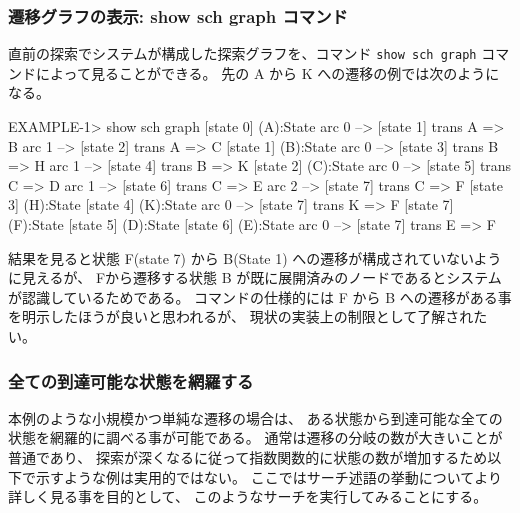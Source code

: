 \documentclass{article}
\begin{document}
\subsubsection{遷移グラフの表示: show sch graph コマンド}
\label{sec:show-sch-graph}
直前の探索でシステムが構成した探索グラフを、コマンド \texttt{show sch graph} コマンドによって見ることができる。
先の A から K への遷移の例では次のようになる。
\begin{simplev}
EXAMPLE-1> show sch graph
[state 0] (A):State
  arc 0 --> [state 1] 
    trans A => B
  arc 1 --> [state 2] 
    trans A => C
[state 1] (B):State
  arc 0 --> [state 3] 
    trans B => H
  arc 1 --> [state 4] 
    trans B => K
[state 2] (C):State
  arc 0 --> [state 5] 
    trans C => D
  arc 1 --> [state 6] 
    trans C => E
  arc 2 --> [state 7] 
    trans C => F
[state 3] (H):State
[state 4] (K):State
  arc 0 --> [state 7] 
    trans K => F
[state 7] (F):State
[state 5] (D):State
[state 6] (E):State
  arc 0 --> [state 7] 
    trans E => F
\end{simplev}
結果を見ると状態 F(state 7) から B(State 1) への遷移が構成されていないように見えるが、
Fから遷移する状態 B が既に展開済みのノードであるとシステムが認識しているためである。
コマンドの仕様的には F から B への遷移がある事を明示したほうが良いと思われるが、
現状の実装上の制限として了解されたい。

\subsubsection{全ての到達可能な状態を網羅する}
本例のような小規模かつ単純な遷移の場合は、
ある状態から到達可能な全ての状態を網羅的に調べる事が可能である。
通常は遷移の分岐の数が大きいことが普通であり、
探索が深くなるに従って指数関数的に状態の数が増加するため以下で示すような例は実用的ではない。
ここではサーチ述語の挙動についてより詳しく見る事を目的として、
このようなサーチを実行してみることにする。
\end{document}
